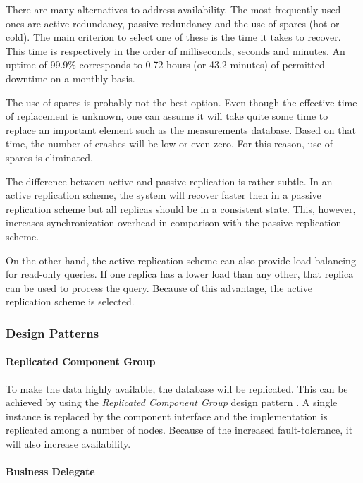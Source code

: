 \npar There are many alternatives to address availability. The most frequently
used ones are active redundancy, passive redundancy and the use of spares (hot
or cold). The main criterion to select one of these is the time it takes to
recover. This time is respectively in the order of milliseconds, seconds and
minutes. An uptime of 99.9\% corresponds to 0.72 hours (or 43.2 minutes) of
permitted downtime on a monthly basis. 

\npar The use of spares is probably not the best option. Even though the
effective time of replacement is unknown, one can assume it will take quite some
time to replace an important element such as the measurements database. Based on
that time, the number of crashes will be low or even zero. For this reason, use
of spares is eliminated.

\npar The difference between active and passive replication is rather subtle.
In an active replication scheme, the system will recover faster then in a
passive replication scheme but all replicas should be in a consistent
state. This, however, increases synchronization overhead in comparison with
the passive replication scheme.

\npar On the other hand, the active replication scheme can also provide load
balancing for read-only queries. If one replica has a lower load than any other,
that replica can be used to process the query. Because of this advantage, the
active replication scheme is selected.

\subsubsection{Design Patterns}
\label{add:it4/patterns}

\paragraph{Replicated Component Group} 

\npar To make the data highly available, the database will be replicated. This
can be achieved by using the \emph{Replicated Component Group} design pattern
\citep[see][p.~326]{Buschmann:07}. A single instance is replaced by the
component interface and the implementation is replicated among a number of
nodes. Because of the increased fault-tolerance, it will also increase availability.

\paragraph{Business Delegate}

